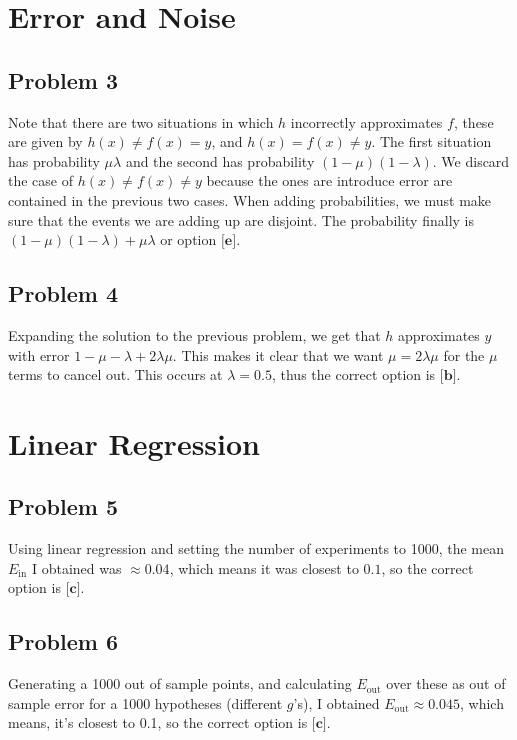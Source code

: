 \documentclass{article}
\begin{document}
\section*{Error and Noise}
\subsection*{Problem 3}
Note that there are two situations in which $h$ incorrectly approximates $f$, these are given by $h(x) \neq f(x) = y$, and $h(x) = f(x) \neq y$. The first situation has probability $\mu \lambda$ and the second has probability $(1-\mu)(1-\lambda)$. We discard the case of $h(x) \neq f(x) \neq y$ because the ones are introduce error are contained in the previous two cases. When adding probabilities, we must make sure that the events we are adding up are disjoint. The probability finally is $(1-\mu)(1-\lambda) + \mu \lambda$ or option $\textbf{[e]}$. 
\subsection*{Problem 4}
Expanding the solution to the previous problem, we get that $h$ approximates $y$ with error $1 - \mu - \lambda + 2\lambda\mu$. This makes it clear that we want $\mu = 2\lambda\mu$ for the $\mu$ terms to cancel out. This occurs at $\lambda = 0.5$, thus the correct option is $\textbf{[b]}$. 
\section*{Linear Regression}
\subsection*{Problem 5}
Using linear regression and setting the number of experiments to 1000, the mean $E_{\text{in}}$ I obtained was $\approx 0.04$, which means it was closest to $0.1$, so the correct option is $\textbf{[c]}$. 
\subsection*{Problem 6}
Generating a 1000 out of sample points, and calculating $E_{\text{out}}$ over these as out of sample error for a 1000 hypotheses (different $g$'s), I obtained $E_{\text{out}} \approx 0.045$, which means, it's closest to 0.1, so the correct option is $\textbf{[c]}$. 
\end{document}
